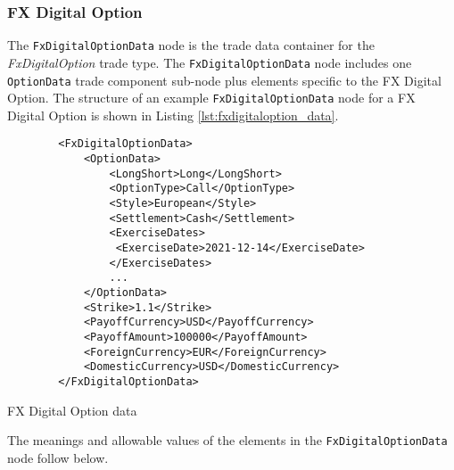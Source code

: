 \subsubsection{FX Digital Option}

The \lstinline!FxDigitalOptionData!  node is the trade data container for the \emph{FxDigitalOption} trade type.   The \lstinline!FxDigitalOptionData!  node includes one  \lstinline!OptionData! trade component sub-node  plus elements
specific to the FX Digital  Option. The structure of an example \lstinline!FxDigitalOptionData! node for a FX Digital  Option is shown in Listing
\ref{lst:fxdigitaloption_data}.

\begin{listing}[H]
\begin{verbatim}
        <FxDigitalOptionData>
            <OptionData>
                <LongShort>Long</LongShort>
                <OptionType>Call</OptionType>
                <Style>European</Style>
                <Settlement>Cash</Settlement>                
                <ExerciseDates>
                 <ExerciseDate>2021-12-14</ExerciseDate>
                </ExerciseDates> 
                ...
            </OptionData>
            <Strike>1.1</Strike>
            <PayoffCurrency>USD</PayoffCurrency>            
            <PayoffAmount>100000</PayoffAmount>            
            <ForeignCurrency>EUR</ForeignCurrency>
            <DomesticCurrency>USD</DomesticCurrency>
        </FxDigitalOptionData>
\end{verbatim}
\caption{FX Digital Option data}
\label{lst:fxdigitaloption_data}
\end{listing}

The meanings and allowable values of the elements in the \lstinline!FxDigitalOptionData!  node follow below.


